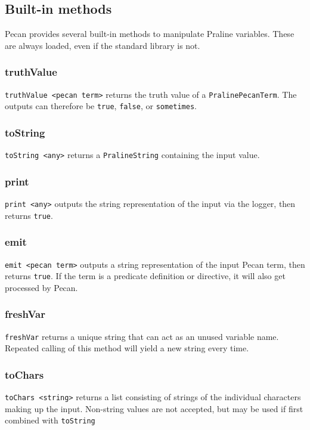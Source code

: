 \documentclass{report}
\begin{document}
\subsection{Built-in methods}
Pecan provides several built-in methods to manipulate Praline variables.
These are always loaded, even if the standard library is not.

\subsubsection{truthValue}
\verb+truthValue <pecan term>+ returns the truth value of a \verb+PralinePecanTerm+.
The outputs can therefore be \verb+true+, \verb+false+, or \verb+sometimes+.

\subsubsection{toString}
\verb+toString <any>+ returns a \verb+PralineString+ containing the input value.

\subsubsection{print}
\verb+print <any>+ outputs the string representation of the input via the logger, then returns \verb+true+.

\subsubsection{emit}
\verb+emit <pecan term>+ outputs a string representation of the input Pecan term, then returns \verb+true+.
If the term is a predicate definition or directive, it will also get processed by Pecan.

\subsubsection{freshVar}
\verb+freshVar+ returns a unique string that can act as an unused variable name.
Repeated calling of this method will yield a new string every time.

\subsubsection{toChars}
\verb+toChars <string>+ returns a list consisting of strings of the individual characters making up the input.
Non-string values are not accepted, but may be used if first combined with \verb+toString+
\end{document}
